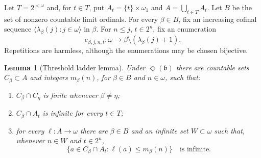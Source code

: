 \documentclass[11pt]{article}
\newtheorem{lemma}[theorem]{Lemma}
\begin{document}
Let $T=2^{<\omega}$ and, for $t\in T$, put
$A_t=\{t\}\times\omega_1$ and $A=\bigcup_{t\in T}A_t$.  Let $B$ be the set of
nonzero countable limit ordinals.  For every $\beta\in B$, fix an increasing
cofinal sequence $\langle\lambda_\beta(j):j\in\omega\rangle$ in $\beta$.
For $n\le j$, $t\in2^n$, fix an enumeration
\[
 e_{\beta,j,n,t}:\omega\longrightarrow
 \beta\setminus(\lambda_\beta(j)+1).
\]
Repetitions are harmless, although the enumerations may be chosen bijective.

\begin{lemma}[Threshold ladder lemma]\label{lem:threshold}
Under $\Diamond(\mathfrak b)$ there are countable sets $C_\beta\subset A$
and integers $m_\beta(n)$, for $\beta\in B$ and $n\in\omega$, such that:
\begin{enumerate}[label=\textup{(\roman*)}]
\item $C_\beta\cap C_\eta$ is finite whenever $\beta\ne\eta$;
\item $C_\beta\cap A_t$ is infinite for every $t\in T$;
\item for every $\ell:A\to\omega$ there are $\beta\in B$ and an infinite
set $W\subset\omega$ such that, whenever $n\in W$ and $t\in2^n$,
\[
 \bigl\{a\in C_\beta\cap A_t:\ell(a)\le m_\beta(n)\bigr\}
 \quad\text{is infinite.}\tag{$\ast$}
\]
\end{enumerate}
\end{lemma}
\end{document}
